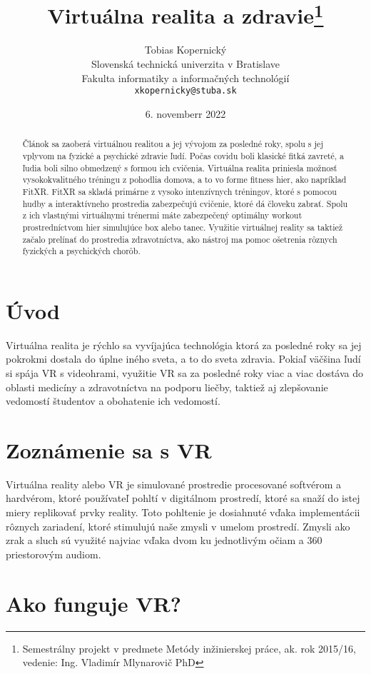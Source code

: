 \documentclass[10pt,twoside,slovak,a4paper]{article}
\title{Virtuálna realita a zdravie\thanks{Semestrálny projekt v predmete Metódy inžinierskej práce, ak. rok 2015/16, vedenie: Ing. Vladimír Mlynarovič PhD}} %
\author{Tobias Kopernický\\[2pt]
	{\small Slovenská technická univerzita v Bratislave}\\
	{\small Fakulta informatiky a informačných technológií}\\
	{\small \texttt{xkopernicky@stuba.sk}}
	}
\date{\small 6. novemberr 2022} %
\begin{document}
\maketitle

\begin{abstract}
Článok sa zaoberá virtuálnou realitou a jej vývojom za posledné roky, spolu s jej vplyvom na fyzické a psychické zdravie ľudí. Počas covidu boli klasické fitká zavreté, a ľudia boli silno obmedzený s formou ich cvičenia. Virtuálna realita priniesla možnosť vysokokvalitného tréningu z pohodlia domova, a to vo forme fitness hier, ako napríklad FitXR. FitXR sa skladá primárne z vysoko intenzívnych tréningov, ktoré s pomocou hudby a interaktívneho prostredia zabezpečujú cvičenie, ktoré dá človeku zabrať. Spolu z ich vlastnými virtuálnymi trénermi máte zabezpečený optimálny workout prostredníctvom hier simulujúce box alebo tanec. Využitie virtuálnej reality sa taktiež začalo prelínať do prostredia zdravotníctva, ako nástroj ma pomoc ošetrenia rôznych fyzických a psychických chorôb.
\end{abstract}


\section{Úvod}

Virtuálna realita je rýchlo sa vyvíjajúca technológia ktorá za posledné roky sa jej pokrokmi dostala do úplne iného sveta, a to do sveta zdravia.  Pokiaľ väčšina ľudí si spája VR s videohrami, využitie VR sa za posledné roky viac a viac dostáva do oblasti medicíny a zdravotníctva\cite{123} na podporu liečby, taktiež aj zlepšovanie vedomostí študentov a obohatenie ich vedomostí.



\section{Zoznámenie sa s VR} \label{Zoznamenie}

Virtuálna reality alebo VR je simulované prostredie procesované softvérom a hardvérom, ktoré používateľ pohltí v digitálnom prostredí, ktoré sa snaží do istej miery replikovať prvky reality. Toto pohltenie je dosiahnuté vďaka implementácii rôznych zariadení, ktoré stimulujú naše zmysli v umelom prostredí. Zmysli ako zrak a sluch sú využité najviac vďaka dvom ku jednotlivým očiam a 360 priestorovým audiom.

\section{Ako funguje VR?} \label{Funguje}
 
\end{document}
